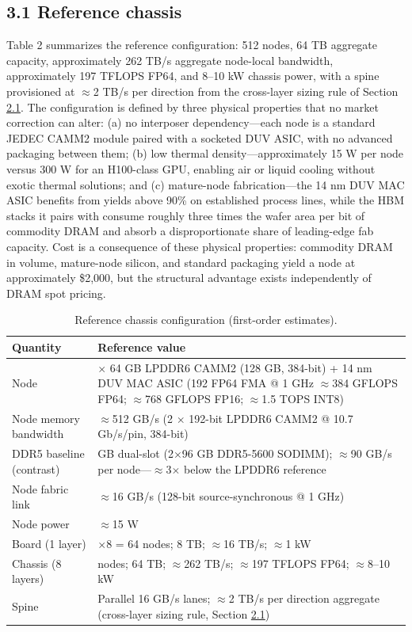\documentclass[12pt,onecolumn]{article}
\begin{document}
\subsection*{3.1 Reference chassis}\label{sec:3.1}

Table 2 summarizes the reference configuration: 512 nodes, 64 TB aggregate capacity, approximately 262 TB/s aggregate node-local bandwidth, approximately 197 TFLOPS FP64, and 8--10 kW chassis power, with a spine provisioned at $\approx$2 TB/s per direction from the cross-layer sizing rule of Section \hyperref[sec:2.1]{2.1}. The configuration is defined by three physical properties that no market correction can alter: (a) no interposer dependency---each node is a standard JEDEC CAMM2 module paired with a socketed DUV ASIC, with no advanced packaging between them; (b) low thermal density---approximately 15 W per node versus 300 W for an H100-class GPU, enabling air or liquid cooling without exotic thermal solutions; and (c) mature-node fabrication---the 14 nm DUV MAC ASIC benefits from yields above 90\% on established process lines, while the HBM stacks it pairs with consume roughly three times the wafer area per bit of commodity DRAM and absorb a disproportionate share of leading-edge fab capacity\cite{25}. Cost is a consequence of these physical properties: commodity DRAM in volume, mature-node silicon, and standard packaging yield a node at approximately \$2,000, but the structural advantage exists independently of DRAM spot pricing.

\begin{table}[t]
\centering
\footnotesize
\caption{Reference chassis configuration (first-order estimates).}\label{tab:2}
\begin{tabularx}{\columnwidth}{>{\hsize=0.5455\hsize}X>{\hsize=1.4545\hsize}X}
\toprule
Quantity & Reference value \\
\midrule
Node & 2 $\times$ 64 GB LPDDR6 CAMM2 (128 GB, 384-bit) + 14 nm DUV MAC ASIC (192 FP64 FMA @ 1 GHz $\approx$384 GFLOPS FP64; $\approx$768 GFLOPS FP16; $\approx$1.5 TOPS INT8) \\
Node memory bandwidth & $\approx$512 GB/s (2 $\times$ 192-bit LPDDR6 CAMM2 @ 10.7 Gb/s/pin, 384-bit) \\
DDR5 baseline (contrast) & 192 GB dual-slot (2$\times$96 GB DDR5-5600 SODIMM); $\approx$90 GB/s per node---$\approx$3$\times$ below the LPDDR6 reference \\
Node fabric link & $\approx$16 GB/s (128-bit source-synchronous @ 1 GHz) \\
Node power & $\approx$15 W \\
Board (1 layer) & 8$\times$8 = 64 nodes; 8 TB; $\approx$16 TB/s; $\approx$1 kW \\
Chassis (8 layers) & 512 nodes; 64 TB; $\approx$262 TB/s; $\approx$197 TFLOPS FP64; $\approx$8--10 kW \\
Spine & Parallel 16 GB/s lanes; $\approx$2 TB/s per direction aggregate (cross-layer sizing rule, Section \hyperref[sec:2.1]{2.1}) \\
\bottomrule
\end{tabularx}
\end{table}
\end{document}
